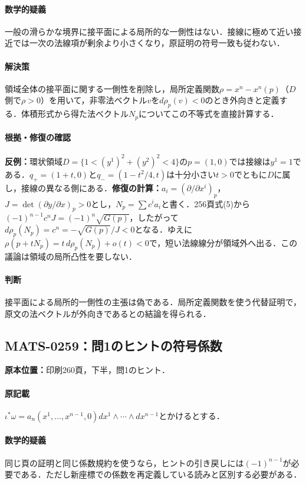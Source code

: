 \documentclass[a4paper,10pt]{ltjsarticle}
\begin{document}
\paragraph{数学的疑義}一般の滑らかな境界に接平面による局所的な一側性はない．接線に極めて近い接近では一次の法線項が剰余より小さくなり，原証明の符号一致も従わない．

\paragraph{解決策}領域全体の接平面に関する一側性を削除し，局所定義関数$\rho=x^n-x^n(p)$（$D$側で$\rho>0$）を用いて，非零法ベクトル$v$を$d\rho_p(v)<0$のとき外向きと定義する．体積形式から得た法ベクトル$N_p$についてこの不等式を直接計算する．

\paragraph{根拠・修復の確認}\textbf{反例：}環状領域$D=\{1<(y^1)^2+(y^2)^2<4\}$の$p=(1,0)$では接線は$y^1=1$である．$q_+=(1+t,0)$と$q_-=(1-t^2/4,t)$は十分小さい$t>0$でともに$D$に属し，接線の異なる側にある．\textbf{修復の計算：}$a_i=(\partial/\partial x^i)_p$，$J=\det(\partial y/\partial x)_p>0$とし，$N_p=\sum c^ia_i$と書く．256頁式(5)から$(-1)^{n-1}c^nJ=(-1)^n\sqrt{G(p)}$，したがって$d\rho_p(N_p)=c^n=-\sqrt{G(p)}/J<0$となる．ゆえに$\rho(p+tN_p)=t\,d\rho_p(N_p)+o(t)<0$で，短い法線線分が領域外へ出る．この議論は領域の局所凸性を要しない．

\paragraph{判断}接平面による局所的一側性の主張は偽である．局所定義関数を使う代替証明で，原文の法ベクトルが外向きであるとの結論を得られる．


\subsection*{MATS-0259：問1のヒントの符号係数}\label{math:MATS-0259}
\noindent\textbf{原本位置：}印刷260頁，下半，問1のヒント．

\paragraph{原記載}$\iota^*\omega=a_n(x^1,\ldots,x^{n-1},0)dx^1\wedge\cdots\wedge dx^{n-1}$とかけるとする．

\paragraph{数学的疑義}同じ頁の証明と同じ係数規約を使うなら，ヒントの引き戻しには$(-1)^{n-1}$が必要である．ただし新座標での係数を再定義している読みと区別する必要がある．
\end{document}
